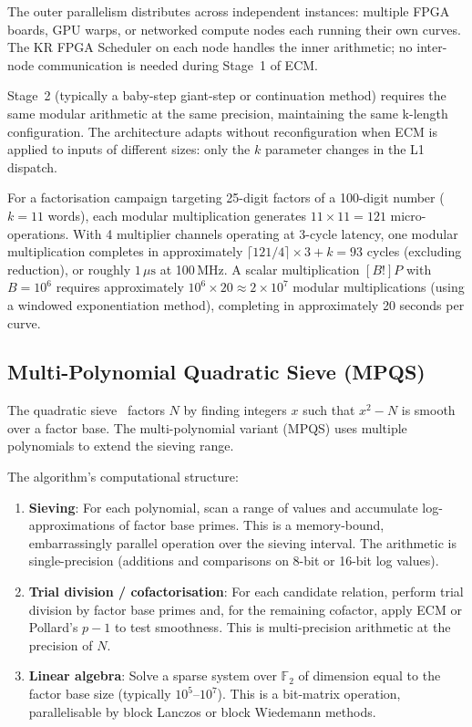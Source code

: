 \documentclass[11pt,a4paper]{article}
\begin{document}
The outer parallelism distributes across independent instances: multiple
FPGA boards, GPU warps, or networked compute nodes each running their own
curves.  The KR FPGA Scheduler on each node handles the inner arithmetic;
no inter-node communication is needed during Stage~1 of ECM.

Stage~2 (typically a baby-step giant-step or continuation method) requires
the same modular arithmetic at the same precision, maintaining the same
k-length configuration.  The architecture adapts without reconfiguration
when ECM is applied to inputs of different sizes: only the $k$ parameter
changes in the L1 dispatch.

For a factorisation campaign targeting 25-digit factors of a 100-digit
number ($k = 11$ words), each modular multiplication generates $11 \times 11
= 121$ micro-operations.  With 4 multiplier channels operating at 3-cycle
latency, one modular multiplication completes in approximately
$\lceil 121/4 \rceil \times 3 + k = 93$ cycles (excluding reduction), or
roughly $1\,\mu\text{s}$ at 100\,MHz.  A scalar multiplication
$[B!]P$ with $B = 10^6$ requires approximately $10^6 \times 20 \approx 2 \times 10^7$
modular multiplications (using a windowed exponentiation method), completing
in approximately 20 seconds per curve.

\subsection{Multi-Polynomial Quadratic Sieve (MPQS)}
\label{sec:mpqs}

The quadratic sieve~\cite{pomerance1982,cohen1993} factors $N$ by finding
integers $x$ such that $x^2 - N$ is smooth over a factor base.  The
multi-polynomial variant (MPQS) uses multiple polynomials to extend the
sieving range.

The algorithm's computational structure:

\begin{enumerate}[leftmargin=*]
  \item \textbf{Sieving}: For each polynomial, scan a range of values and
    accumulate log-approximations of factor base primes.  This is a
    memory-bound, embarrassingly parallel operation over the sieving interval.
    The arithmetic is single-precision (additions and comparisons on 8-bit
    or 16-bit log values).

  \item \textbf{Trial division / cofactorisation}: For each candidate
    relation, perform trial division by factor base primes and, for the
    remaining cofactor, apply ECM or Pollard's $p-1$ to test smoothness.
    This is multi-precision arithmetic at the precision of $N$.

  \item \textbf{Linear algebra}: Solve a sparse system over $\mathbb{F}_2$
    of dimension equal to the factor base size (typically $10^5$--$10^7$).
    This is a bit-matrix operation, parallelisable by block Lanczos or
    block Wiedemann methods.
\end{enumerate}
\end{document}
